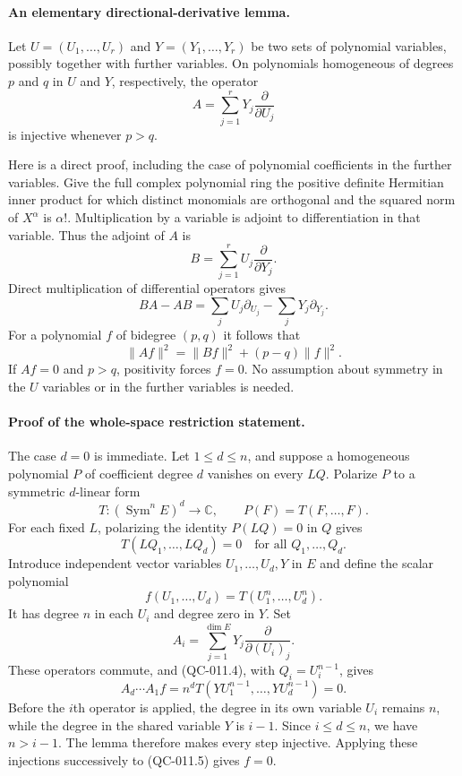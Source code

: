 \paragraph{An elementary directional-derivative lemma.}
Let $U=(U_1,\ldots,U_r)$ and $Y=(Y_1,\ldots,Y_r)$ be two sets
of polynomial variables, possibly together with further variables.
On polynomials homogeneous of degrees $p$ and $q$ in $U$ and $Y$,
respectively, the operator
\[
               A=\sum_{j=1}^rY_j\frac{\partial}{\partial U_j}
\]
is injective whenever $p>q$.

Here is a direct proof, including the case of polynomial coefficients
in the further variables.  Give the full complex polynomial ring the
positive definite Hermitian inner product for which distinct monomials
are orthogonal and the squared norm of $X^\alpha$ is $\alpha!$.
Multiplication by a variable is adjoint to differentiation in that
variable.  Thus the adjoint of $A$ is
\[
               B=\sum_{j=1}^rU_j\frac{\partial}{\partial Y_j}.
\]
Direct multiplication of differential operators gives
\[
        BA-AB=\sum_jU_j\partial_{U_j}-\sum_jY_j\partial_{Y_j}.
\]
For a polynomial $f$ of bidegree $(p,q)$ it follows that
\[
       \|Af\|^2=\|Bf\|^2+(p-q)\|f\|^2.
       \tag{QC-011.3}
\]
If $Af=0$ and $p>q$, positivity forces $f=0$.  No assumption
about symmetry in the $U$ variables or in the further variables is
needed.

\paragraph{Proof of the whole-space restriction statement.}
The case $d=0$ is immediate.  Let $1\leq d\leq n$, and suppose
a homogeneous polynomial $P$ of coefficient degree $d$ vanishes
on every $LQ$.  Polarize $P$ to a symmetric $d$-linear form
\[
       T:(\operatorname{Sym}^nE)^d\longrightarrow\mathbb C,
       \qquad P(F)=T(F,\ldots,F).
\]
For each fixed $L$, polarizing the identity $P(LQ)=0$ in $Q$
gives
\[
               T(LQ_1,\ldots,LQ_d)=0
               \quad\text{for all }Q_1,\ldots,Q_d.
               \tag{QC-011.4}
\]
Introduce independent vector variables $U_1,\ldots,U_d,Y$ in $E$
and define the scalar polynomial
\[
             f(U_1,\ldots,U_d)=T(U_1^n,\ldots,U_d^n).
\]
It has degree $n$ in each $U_i$ and degree zero in $Y$.  Set
\[
               A_i=\sum_{j=1}^{\dim E}Y_j
                                \frac{\partial}{\partial (U_i)_j}.
\]
These operators commute, and (QC-011.4), with
$Q_i=U_i^{n-1}$, gives
\[
       A_d\cdots A_1 f
          =n^d T(YU_1^{n-1},\ldots,YU_d^{n-1})=0.
          \tag{QC-011.5}
\]
Before the $i$th operator is applied, the degree in its own variable
$U_i$ remains $n$, while the degree in the shared variable $Y$
is $i-1$.  Since $i\leq d\leq n$, we have $n>i-1$.
The lemma therefore makes every step injective.  Applying these
injections successively to (QC-011.5) gives $f=0$.

